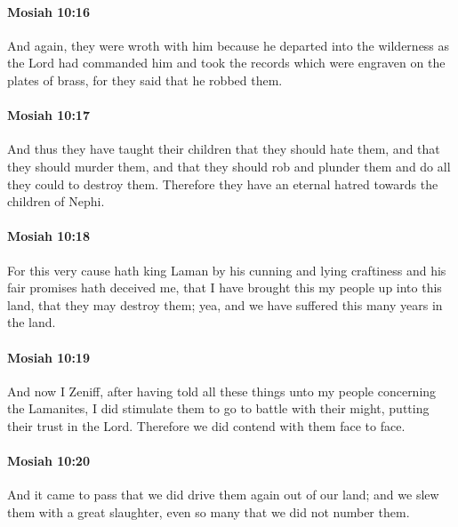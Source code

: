 		\paragraph{Mosiah 10:16} %
			\label{MOSIAH-10-16}

			And again, they were wroth with him
			because he departed into the wilderness as the Lord had commanded him
			and took the records which were engraven on the plates of brass,
			for they said that he robbed them.

		\paragraph{Mosiah 10:17} %
			\label{MOSIAH-10-17}

			And thus they have taught their children that they should hate them,
			and that they should murder them,
			and that they should rob and plunder them
			and do all they could to destroy them.
			Therefore they have an eternal hatred towards the children of Nephi.

		\paragraph{Mosiah 10:18} %
			\label{MOSIAH-10-18}

			For this very cause hath king Laman
			by his cunning and lying craftiness and his fair promises hath deceived me,
			that I have brought this my people up into this land,
			that they may destroy them;
			yea, and we have suffered this many years in the land.

		\paragraph{Mosiah 10:19} %
			\label{MOSIAH-10-19}

			And now I Zeniff,
			after having told all these things unto my people concerning the Lamanites,
			I did stimulate them to go to battle with their might,
			putting their trust in the Lord.
			Therefore we did contend with them face to face.

		\paragraph{Mosiah 10:20} %
			\label{MOSIAH-10-20}

			And it came to pass that we did drive them again out of our land;
			and we slew them with a great slaughter,
			even so many that we did not number them.

